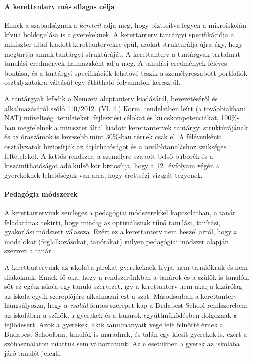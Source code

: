 \paragraph{A kerettanterv másodlagos célja}  Ennek a szabadságnak a \emph{kereteit} adja meg, hogy biztosítva legyen a mikroiskolán kívüli boldogulása is a gyerekeknek. A kerettanterv
 tantárgyi specifikációja a miniszter által kiadott kerettantervekre \citep{ofi:kerettanterv} épül, azokat strukturálja újra úgy, hogy megtartja annak tantárgyi struktúráját. A kerettanterv a tantárgyak tartalmát tanulási eredmények halmazaként adja meg. A tanulási eredmények féléves bontása, és a tantárgyi specifikációk lehetővé teszik a személyreszabott portfóliók osztályzatokra váltását egy átlátható folyamaton keresztül.

A tantárgyak lefedik a Nemzeti alaptanterv kiadásáról, bevezetéséről és alkalmazásáról szóló 110/2012. (VI. 4.) Korm. rendeletben leírt (a továbbiakban: NAT) műveltségi területeket, fejlesztési célokat és kulcskompetenciákat, 100\%-ban megfelelnek a miniszter által kiadott kerettantervek tantárgyi struktúrájának és az óraszámok is kevesebb mint 30\%-ban térnek csak el. A félévenkénti osztályzatok biztosítják az átjárhatóságot és a továbbtanuláshoz szükséges feltételeket. A kettős rendszer, a személyre szabott belső buborék és a kiszámíthatóságot adó külső kör biztosítja, hogy a 12.~évfolyam végén a gyerekeknek lehetőségük van arra, hogy érettségi vizsgát tegyenek.

\paragraph{Pedagógia módszerek}
A kerettantervünk semleges a pedagógiai módszerekkel kapcsolatban, a tanár feladatának tekinti, hogy mindig az optimálisnak tűnő tanulási, tanítási, gyakorlási módszert válassza. Ezért ez a kerettanterv nem beszél arról, hogy a modulokat (foglalkozásokat, tanórákat) milyen pedagógiai módszer alapján szervezi a tanár.

A kerettantervünk az iskolába járókat gyerekeknek hívja, nem tanulóknak és nem diákoknak. Ennek fő oka, hogy a rendszerünkben a tanárok és a szülők is tanulók, sőt az egész iskola egy tanuló szervezet, így a kerettanterv nem akarja  kizárólag az iskola egyik szereplőjére alkalmazni ezt a szót. Másodsorban a kerettanterv hangsúlyozza, hogy a \emph{család} fontos szerepet kap a Budapest School rendszerében: az iskolában a szülők, a gyerekek és a tanárok együttműködésben dolgoznak a fejlődésért. Azok a gyerekek, akik tanulmányaik vége felé felnőtté érnek a Budapest Schoolban, tanulók is maradnak, és talán egy kicsit gyerekek is, ezért a szóhasználaton miattuk sem változtatunk. Az ő esetükben a gyerek az iskolába járó tanulót jelenti.


